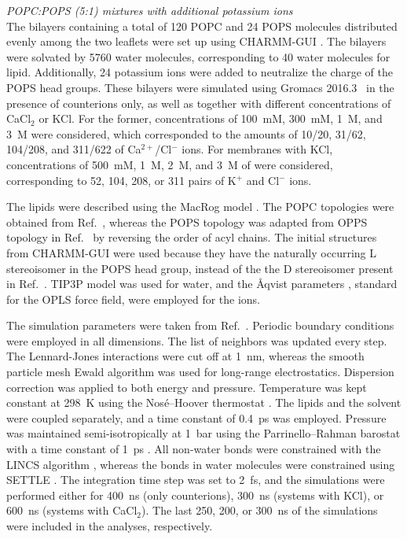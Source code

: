 \documentclass[journal=jpcbfk,manuscript=article]{achemso}
\begin{document}
\noindent
{\it POPC:POPS (5:1) mixtures with additional potassium ions} \\
The bilayers containing a total of 120 POPC and 24 POPS molecules distributed evenly among the 
two leaflets were set up using CHARMM-GUI \cite{lee16,jo18}.
The bilayers were solvated by 5760 water molecules, corresponding to 40 water molecules for lipid.
Additionally, 24 potassium ions were added to neutralize the charge of the POPS head groups.
These bilayers were simulated using Gromacs 2016.3~\cite{abraham2015gromacs} in the presence of counterions only, as well as together with different
concentrations of CaCl$_2$ or KCl. For the former, concentrations of 100~mM, 300~mM, 1~M, and 3~M 
were considered, which corresponded to the amounts of 10/20, 31/62, 104/208, and 311/622 
of Ca$^{2+}$/Cl$^-$ ions. For membranes with KCl, concentrations of 500~mM, 1~M, 2~M, and 3~M of 
were considered, corresponding to 52, 104, 208, or 311 pairs of K$^+$ and Cl$^-$ ions.

The lipids were described using the MacRog model \cite{maciejewski14,kulig15b,rog16}. The POPC topologies were obtained from 
Ref.~, whereas the POPS topology was adapted from OPPS topology in
Ref.~ by reversing the order of acyl chains.
The initial structures from CHARMM-GUI were used because they have the
naturally occurring L stereoisomer in the POPS head group, instead of the 
the D stereoisomer present in Ref.~.
TIP3P model \cite{jorgensen83} was used for water, and the \AA{}qvist parameters 
\cite{aqvist90}, standard for the OPLS force field, were employed for the ions. 

The simulation parameters were taken from Ref.~. 
Periodic boundary conditions were employed in all dimensions. The list of neighbors was updated every step. 
The Lennard-Jones interactions were cut off at 1~nm, whereas the smooth particle mesh Ewald algorithm 
\cite{essman95} was used for long-range electrostatics. Dispersion correction \cite{shirts07} 
was applied to both energy and pressure. Temperature was kept constant at 298~K using the 
Nos\'{e}--Hoover thermostat \cite{nose84,hoover85}. The lipids and 
the solvent were coupled separately, and a time constant of 0.4~ps was employed. Pressure was 
maintained semi-isotropically at 1~bar using the Parrinello--Rahman barostat with a time constant of 1~ps 
\cite{parrinello81}. All non-water bonds were constrained with the LINCS algorithm 
\cite{hess97,hess07},
whereas the bonds in water molecules were constrained using SETTLE \cite{miyamoto92}.
The integration time step was set to 2~fs, and the simulations were performed either for 400~ns 
(only counterions), 300~ns (systems with KCl), or 600~ns (systems with CaCl$_2$). The last 
250, 200, or 300~ns of the simulations were included in the analyses, respectively.
\end{document}
